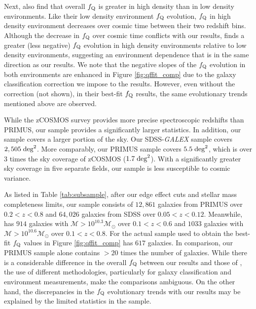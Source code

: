 \documentclass{emulateapj}
\begin{document}
Next, \cite{Kovac:2014aa} also find that overall $f_{\rm{Q}}$ is
greater in high density than in low density environments. Like their
low density environment $f_{\rm{Q}}$ evolution, $f_{\rm{Q}}$ in high
density environment decreases over cosmic time between their two
redshift bins. Although the decrease in $f_{\rm{Q}}$ over cosmic time
conflicts with our results, \cite{Kovac:2014aa} finds a greater (less
negative) $f_{\rm{Q}}$ evolution in high density environments relative
to low density environments, suggesting an environment dependence that
is in the same direction as our results. We note that the negative
slopes of the $f_{\rm{Q}}$ evolution in both environments are enhanced
in Figure \ref{fig:qffit_comp} due to the galaxy classification
correction we impose to the \cite{Kovac:2014aa} results. However, even
without the correction (not shown), in their best-fit $f_{\rm{Q}}$
results, the same evolutionary trends mentioned above are observed.

While the zCOSMOS survey provides more precise spectroscopic redshifts than PRIMUS, our sample provides a significantly larger statistics. In addition, our sample covers a larger portion of the sky. Our SDSS-{\em GALEX} sample covers $2,505 \;\rm{deg}^2$. More comparably, our PRIMUS sample covers $5.5 \;\rm{deg}^2$, which is over 3 times the sky coverage of zCOSMOS ($1.7 \;\rm{deg}^2$). With a significantly greater sky coverage in five separate fields, our sample is less susceptible to cosmic variance. 

As listed in Table \ref{tab:subsample}, after our edge effect cuts and
stellar mass completeness limits, our sample consists of $12,861$
galaxies from PRIMUS over $0.2< z< 0.8$ and $64,026$ galaxies from
SDSS over $0.05 < z < 0.12$. Meanwhile, \cite{Iovino:2010aa} has $914$
galaxies with $\mathcal{M} > 10^{10.3} \mathcal{M}_{\odot}$ over $0.1
< z < 0.6$ and $1033$ galaxies with $\mathcal{M} > 10^{10.6}
\mathcal{M}_{\odot}$ over $0.1 < z < 0.8$. For the actual sample used
to obtain the best-fit $f_{\rm{Q}}$ values in Figure
\ref{fig:qffit_comp} \cite{Iovino:2010aa} has $617$ galaxies. In
comparison, our PRIMUS sample alone contains $> 20$ times the number
of galaxies. While there is a considerable difference in the overall
$f_{\rm{Q}}$ between our results and those of \cite{Iovino:2010aa},
the use of different methodologies, particularly for galaxy
classification and environment measurements, make the comparisons
ambiguous. On the other hand, the discrepancies in the $f_{\rm{Q}}$
evolutionary trends with our results may be explained by the limited
statistics in the \cite{Iovino:2010aa} sample.
\end{document}
